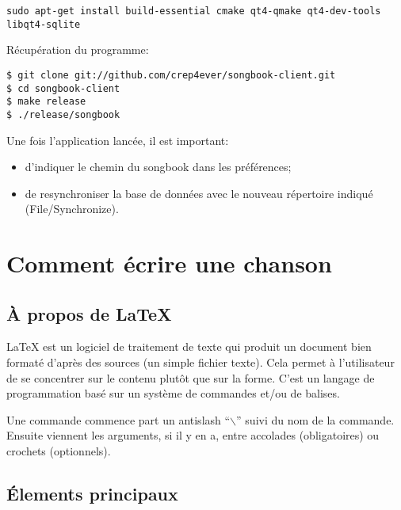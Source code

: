 \documentclass[a4paper]{article}
\begin{document}
\begin{verbatim}
sudo apt-get install build-essential cmake qt4-qmake qt4-dev-tools libqt4-sqlite
\end{verbatim}

Récupération du programme:

\begin{verbatim}
$ git clone git://github.com/crep4ever/songbook-client.git
$ cd songbook-client
$ make release
$ ./release/songbook
\end{verbatim}

Une fois l'application lancée, il est important:
\begin{itemize}
\item d'indiquer le chemin du songbook dans les préférences;
\item de resynchroniser la base de données avec le nouveau répertoire indiqué (File/Synchronize).
\end{itemize}


\section{Comment écrire une chanson}

\subsection{À propos de LaTeX}

LaTeX est un logiciel de traitement de texte qui produit un document
bien formaté d'après des sources (un simple fichier texte). Cela
permet à l'utilisateur de se concentrer sur le contenu plutôt que sur
la forme. C'est un langage de programmation basé sur un système de
commandes et/ou de balises.

Une commande commence part un antislash ``$\backslash$'' suivi du nom
de la commande. Ensuite viennent les arguments, si il y en a, entre
accolades (obligatoires) ou crochets (optionnels).

\subsection{Élements principaux}
\end{document}
